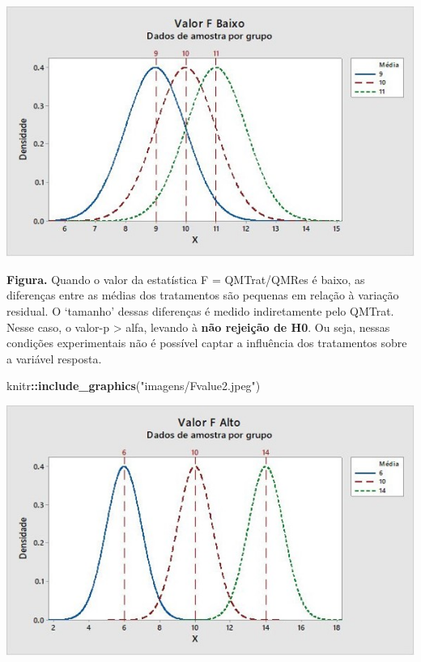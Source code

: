 \documentclass[
]{book}
\newenvironment{Shaded}{\begin{snugshade}}{\end{snugshade}}
\newcommand{\FunctionTok}[1]{\textcolor[rgb]{0.13,0.29,0.53}{\textbf{#1}}}
\newcommand{\NormalTok}[1]{#1}
\newcommand{\SpecialCharTok}[1]{\textcolor[rgb]{0.81,0.36,0.00}{\textbf{#1}}}
\newcommand{\StringTok}[1]{\textcolor[rgb]{0.31,0.60,0.02}{#1}}
\begin{document}
\includegraphics[width=1\linewidth]{imagens/Fvalue1}

\textbf{Figura.} Quando o valor da estatística F = QMTrat/QMRes é baixo, as diferenças entre as médias dos tratamentos são pequenas em relação à variação residual. O `tamanho' dessas diferenças é medido indiretamente pelo QMTrat. Nesse caso, o valor-p \textgreater{} alfa, levando à \textbf{não rejeição de H0}. Ou seja, nessas condições experimentais não é possível captar a influência dos tratamentos sobre a variável resposta.

\begin{Shaded}
\begin{Highlighting}[]
\NormalTok{knitr}\SpecialCharTok{::}\FunctionTok{include\_graphics}\NormalTok{(}\StringTok{"imagens/Fvalue2.jpeg"}\NormalTok{)}
\end{Highlighting}
\end{Shaded}

\includegraphics[width=1\linewidth]{imagens/Fvalue2}
\end{document}
